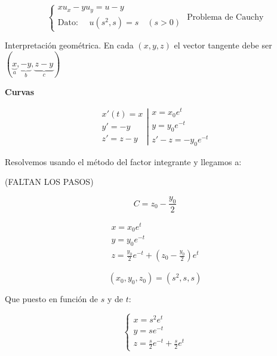 	\begin{example}{1}

		\begin{equation*}
			\left\{
			\begin{array}{l}
				xu_x - yu_y = u - y \\
				\text{Dato: }\quad u(s^2,s) = s \quad (s > 0)
			\end{array}
			\right. \text{  Problema de Cauchy}
		\end{equation*}

		Interpretación geométrica. En cada $(x,y,z)$ el vector tangente debe ser $(\underbrace{x}_{a},\underbrace{-y}_{b},\underbrace{z-y}_{c})$

		\textbf{Curvas}

		\begin{equation*}
			\left.
			\begin{array}{rl}
				 x'(t) = x \\
				 y' = -y \\
				 z' = z-y
			\end{array}
			\right|
			\begin{array}{l}
				x = x_0 e^t \\
				y = y_0 e^{-t} \\
				z' -z = -y_0 e^{-t}
			\end{array}
		\end{equation*}


		Resolvemos usando el método del factor integrante y llegamos a:

		(FALTAN LOS PASOS)

		$$C = z_0 - \frac{y_0}{2}$$

		\begin{equation*}
			\begin{array}{l}
				x = x_0 e^t \\
				y = y_0 e^{-t} \\
				z = \frac{y_0}{2} e^{-t} + (z_0 - \frac{y_0}{2})e^t
			\end{array}
		\end{equation*}

		$$(x_0,y_0,z_0) = (s^2,s,s)$$

		Que puesto en función de $s$ y de $t$:

		\begin{equation*}
			\left\{
			\begin{array}{l}
				x = s^2 e^t \\
				y = se^{-t} \\
				z = \frac{s}{2}e^{-t} + \frac{s}{2}e^{t}
			\end{array}
			\right.
		\end{equation*}


\end{example}
